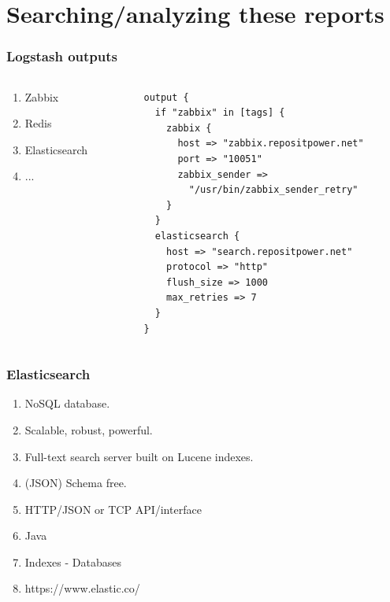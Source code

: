 \documentclass[13pt, ignorenonframetext]{beamer}
\begin{document}
\section{Searching/analyzing these reports}
\begin{frame}[fragile]
\frametitle{Logstash outputs}
      \begin{columns}[c] %
     \begin{column}{3.0cm} %
\begin{enumerate}
\item Zabbix
\item Redis
\item Elasticsearch
\item ...
\end{enumerate}
     \end{column}
     \begin{column}{6.0cm} %
\begin{lstlisting}[basicstyle=\scriptsize]
output {
  if "zabbix" in [tags] {
    zabbix {
      host => "zabbix.repositpower.net"
      port => "10051"
      zabbix_sender => 
        "/usr/bin/zabbix_sender_retry"
    }
  }
  elasticsearch {
    host => "search.repositpower.net"
    protocol => "http"
    flush_size => 1000
    max_retries => 7
  }
}
\end{lstlisting}
     \end{column}
     \end{columns}
\end{frame}


\begin{frame}
\frametitle{Elasticsearch}
\begin{enumerate}
\item NoSQL database.
\item Scalable, robust, powerful.
\item Full-text search server built on Lucene indexes.
\item (JSON) Schema free.
\item HTTP/JSON or TCP API/interface
\item Java
\item Indexes - Databases
\item https://www.elastic.co/
\end{enumerate}
\end{frame}
\end{document}
